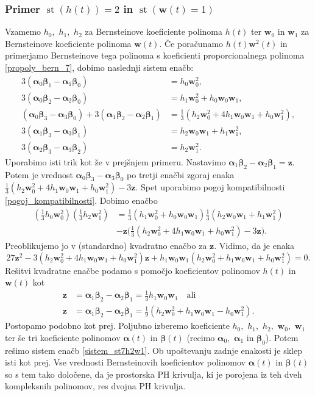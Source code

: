 \documentclass[12pt,a4paper,twoside]{article}
\theoremstyle{definition} %
\theoremstyle{plain} %
\numberwithin{equation}{section}  %
\newcommand{\wV}{\mathbf{w}}
\newcommand{\zV}{\mathbf{z}}
\newcommand{\balpha}{\boldsymbol \alpha}
\newcommand{\bbeta}{\boldsymbol \beta}
\DeclareMathOperator{\st}{st}
\begin{document}
\subsubsection{Primer \texorpdfstring{$\st(h(t))=2$}{st(h(t))=2} in \texorpdfstring{$\st(\wV(t)=1)$}{st(w(t))=1}}
\label{klasifikacija_h2w1}

Vzamemo $h_0,$ $h_1,$ $h_2$ za Bernsteinove koeficiente polinoma $h(t)$ ter $\wV_0$ in $\wV_1$ za Bernsteinove koeficiente polinoma $\wV(t).$ Če poračunamo $h(t)\wV^2(t)$ in primerjamo Bernsteinove tega polinoma s koeficienti proporcionalnega polinoma \eqref{propoly_bern_7}, dobimo naslednji sistem enačb:
\begin{align}
	3(\balpha_0\bbeta_1-\balpha_1\bbeta_0)&=h_0\wV_0^2,\nonumber\\
	3(\balpha_0\bbeta_2-\balpha_2\bbeta_0)&=h_1\wV_0^2+h_0\wV_0\wV_1,\nonumber\\
	(\balpha_0\bbeta_3-\balpha_3\bbeta_0)+3(\balpha_1\bbeta_2-\balpha_2\bbeta_1)&=\frac{1}{3}(h_2\wV_0^2+4h_1\wV_0\wV_1+h_0\wV_1^2),\nonumber\\
	3(\balpha_1\bbeta_3-\balpha_3\bbeta_1)&=h_2\wV_0\wV_1+h_1\wV_1^2,\nonumber\\
	3(\balpha_2\bbeta_3-\balpha_3\bbeta_2)&=h_2\wV_1^2.\label{sistem_st7h2w1}
\end{align}
Uporabimo isti trik kot že v prejšnjem primeru. Nastavimo $\balpha_1\bbeta_2-\balpha_2\bbeta_1=\zV.$ Potem je vrednost $\balpha_0\bbeta_3-\balpha_3\bbeta_0$ po tretji enačbi zgoraj enaka $\frac{1}{3}(h_2\wV_0^2+4h_1\wV_0\wV_1+h_0\wV_1^2)-3\zV.$ Spet uporabimo pogoj kompatibilnosti \eqref{pogoj_kompatibilnosti}. Dobimo enačbo
\begin{align*}
	\left(\frac{1}{3}h_0\wV_0^2\right)\left(\frac{1}{3}h_2\wV_1^2\right)&=\frac{1}{3}(h_1\wV_0^2+h_0\wV_0\wV_1)\frac{1}{3}(h_2\wV_0\wV_1+h_1\wV_1^2)\nonumber\\
	&-\zV\Big(\frac{1}{3}(h_2\wV_0^2+4h_1\wV_0\wV_1+h_0\wV_1^2)-3\zV\Big).
\end{align*}
Preoblikujemo jo v (standardno) kvadratno enačbo za $\zV.$ Vidimo, da je enaka
\begin{equation*}
	27\zV^2-3(h_2\wV_0^2+4h_1\wV_0\wV_1+h_0\wV_1^2)\zV+h_1\wV_0\wV_1(h_2\wV_0^2+h_1\wV_0\wV_1+h_0\wV_1^2)=0.
\end{equation*}
Rešitvi kvadratne enačbe podamo s pomočjo koeficientov polinomov $h(t)$ in $\wV(t)$ kot
\begin{align}
	\zV&=\balpha_1\bbeta_2-\balpha_2\bbeta_1=\frac{1}{3}h_1\wV_0\wV_1\quad\text{ali}\nonumber\\
	\zV&=\balpha_1\bbeta_2-\balpha_2\bbeta_1=\frac{1}{9}(h_2\wV_0^2+h_1\wV_0\wV_1-h_0\wV_1^2).\label{st7h2w1}
\end{align}
Postopamo podobno kot prej. Poljubno izberemo koeficiente $h_0,$ $h_1,$ $h_2,$ $\wV_0,$ $\wV_1$ ter še tri koeficiente polinomov $\balpha(t)$ in $\bbeta(t)$ (recimo $\balpha_0,$ $\balpha_1$ in $\bbeta_0$). Potem rešimo sistem enačb \eqref{sistem_st7h2w1}. Ob upoštevanju zadnje enakosti je sklep isti kot prej. Vse vrednosti Bernsteinovih koeficientov polinomov $\balpha(t)$ in $\bbeta(t)$ so s tem tako določene, da je prostorska PH krivulja, ki je porojena iz teh dveh kompleksnih polinomov, res dvojna PH krivulja.
\end{document}
